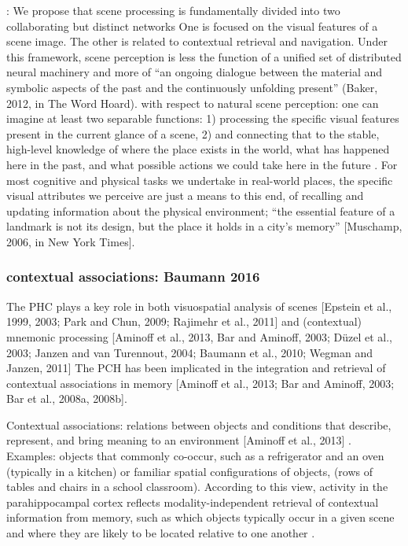 \documentclass[english]{article}
\begin{document}
\citep{baldassano2016two}: We propose that scene processing is fundamentally
divided into two collaborating but distinct networks
%
One is focused on the visual features of a scene image. The other is related to
contextual retrieval and navigation.
%
Under this framework, scene perception is less the function of a unified set of
distributed neural machinery and more of ``an ongoing dialogue between the
material and symbolic aspects of the past and the continuously unfolding
present'' (Baker, 2012, in The Word Hoard).
%
\citep{baldassano2016two} with respect to natural scene perception: one can
imagine at least two separable functions:
%
1) processing the specific visual features present in the current glance of a
scene,
%
2) and connecting that to the stable, high-level knowledge of where the place
exists in the world, what has happened here in the past, and what possible
actions we could take here in the future \citep{baldassano2016two}.
%
For most cognitive and physical tasks we undertake in real-world places, the
specific visual attributes we perceive are just a means to this end, of
recalling and updating information about the physical environment; ``the
essential feature of a landmark is not its design, but the place it holds in a
city’s memory'' [Muschamp, 2006, in New York Times]\citep{baldassano2016two}.


\subsubsection{contextual associations: Baumann 2016}

The PHC plays a key role in both visuospatial analysis of scenes [Epstein et
al., 1999, 2003; Park and Chun, 2009; Rajimehr et al., 2011] and (contextual)
mnemonic processing [Aminoff et al., 2013, Bar and Aminoff, 2003; Düzel et al.,
    2003; Janzen and van Turennout, 2004; Baumann et al., 2010; Wegman and
Janzen, 2011] \citep{baumann2016functional}
The PCH has been implicated in the integration and retrieval of contextual
associations in memory [Aminoff et al., 2013; Bar and Aminoff, 2003; Bar et al.,
2008a, 2008b].


Contextual associations: relations between objects and conditions that describe,
represent, and bring meaning to an environment [Aminoff et al., 2013]
\citep{baumann2016functional}.
%
Examples: objects that commonly co-occur, such as a refrigerator and an oven
(typically in a kitchen) or familiar spatial configurations of objects, (rows of
tables and chairs in a school classroom). According to this view, activity in
the parahippocampal cortex reflects modality-independent retrieval of contextual
information from memory, such as which objects typically occur in a given scene
and where they are likely to be located relative to one another
\citep{baumann2016functional}.
\end{document}
